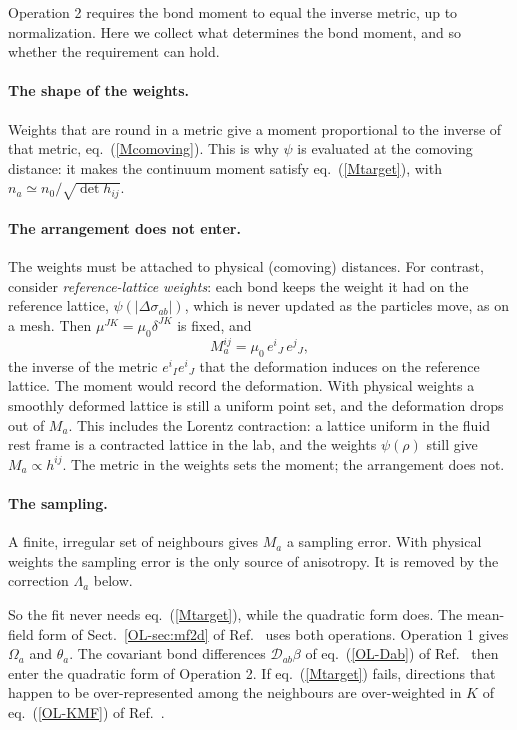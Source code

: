 \documentclass[11pt,aps,preprint,nofootinbib,superscriptaddress,tightenlines]{revtex4-2}
\def\st{\begin{equation}}
\def\stp{\end{equation}}
\def\Eq#1{eq.~(\ref{#1})}
\newcommand{\EqOL}[1]{eq.~(\ref{OL-#1}) of Ref.~\cite{OneLevel}}
\newcommand{\SectOL}[1]{Sect.~\ref{OL-#1} of Ref.~\cite{OneLevel}}
\let\oldparagraph\paragraph
\renewcommand{\paragraph}{\par\medskip\oldparagraph}
\begin{document}
Operation 2 requires the bond moment to equal the inverse metric, up to
normalization.  Here we collect what determines the bond moment, and so whether
the requirement can hold.

\paragraph{The shape of the weights.}  Weights that are round in a metric give a
moment proportional to the inverse of that metric, \Eq{Mcomoving}.  This is why
$\psi$ is evaluated at the comoving distance: it makes the continuum moment
satisfy \Eq{Mtarget}, with $n_a\simeq n_0/\sqrt{\det h_{ij}}$.

\paragraph{The arrangement does not enter.}  The weights must be attached to
physical (comoving) distances.  For contrast, consider
\emph{reference-lattice weights}: each bond keeps the weight it had on the
reference lattice, $\psi(|\Delta\sigma_{ab}|)$, which is never updated as the
particles move, as on a mesh.  Then $\mu^{JK}=\mu_0\delta^{JK}$ is fixed, and
\st
M_a^{ij}=\mu_0\,e^i{}_J\,e^j{}_J ,
\stp
the inverse of the metric $e^i{}_Ie^i{}_J$ that the deformation induces on the
reference lattice.  The moment would record the deformation.  With physical weights a smoothly deformed lattice is still a
uniform point set, and the deformation drops out of $M_a$.  This includes the
Lorentz contraction: a lattice uniform in the fluid rest frame is a contracted
lattice in the lab, and the weights $\psi(\rho)$ still give $M_a\propto h^{ij}$.  The
metric in the weights sets the moment; the arrangement does not.

\paragraph{The sampling.}  A finite, irregular set of neighbours gives $M_a$ a
sampling error.  With physical weights the sampling error is the only source of
anisotropy.  It is removed by the correction $\Lambda_a$ below.

So the fit never needs \Eq{Mtarget}, while the quadratic form does.  The
mean-field form of \SectOL{sec:mf2d} uses both operations.  Operation 1 gives
$\Omega_a$ and $\theta_a$.  The covariant bond differences $\mathcal D_{ab}\beta$ of \EqOL{Dab} then
enter the quadratic form of Operation 2.  If \Eq{Mtarget} fails, directions that
happen to be over-represented among the neighbours are over-weighted in
$K$ of \EqOL{KMF}.
\end{document}
